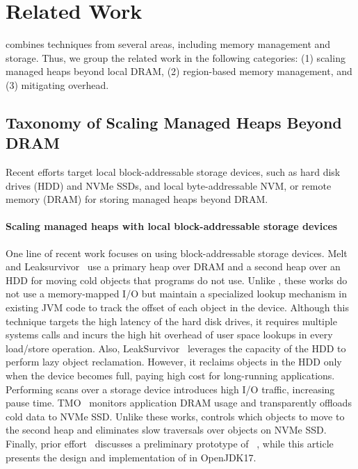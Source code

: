 \section{Related Work}
\teraheapName{} combines techniques from several areas, including memory
management and storage. Thus, we group the related work in the
following categories:
%
(1) scaling managed heaps beyond local DRAM,
%
(2) region-based memory management, and
%
(3) mitigating \teraheapSD overhead.

\subsection{Taxonomy of Scaling Managed Heaps Beyond DRAM}
Recent efforts target local block-addressable storage devices, such as
hard disk drives (HDD) and NVMe SSDs, and local
byte-addressable NVM, or remote memory (DRAM) for storing managed
heaps beyond DRAM.

\paragraph{\textbf{Scaling managed heaps with local block-addressable
storage devices}}
One line of recent work focuses on using block-addressable storage
devices. Melt~\cite{bond:melt} and Leaksurvivor~\cite{leaksurvivor}
use a primary heap over DRAM and a second heap over an HDD for moving
cold objects that programs do not use. Unlike \teraheapName{}, these works do
not use a memory-mapped I/O but maintain a specialized lookup
mechanism in existing JVM code to track the offset of each object in
the device. Although this technique targets the high latency of the
hard disk drives, it requires multiple systems calls and incurs the
high hit overhead of user space lookups in every load/store operation.
Also, LeakSurvivor~\cite{leaksurvivor} leverages the capacity of the
HDD to perform lazy object reclamation. However, it reclaims objects
in the HDD only when the device becomes full, paying high \teraheapGC cost for
long-running applications. Performing \teraheapGC scans over a storage device
introduces high I/O traffic, increasing \teraheapGC pause time.
TMO~\cite{weiner:tmo} monitors application DRAM usage and
transparently offloads cold data to NVMe SSD. Unlike these works,
\teraheapName{} controls which objects to move to the second heap and
eliminates slow \teraheapGC traversals over objects on NVMe SSD. Finally,
prior effort~\cite{kolokasis:teracache} discusses a preliminary
prototype of \teraheapName{}~\cite{teraheap}, while this article presents the
design and implementation of \teraheapName{} in OpenJDK17.

